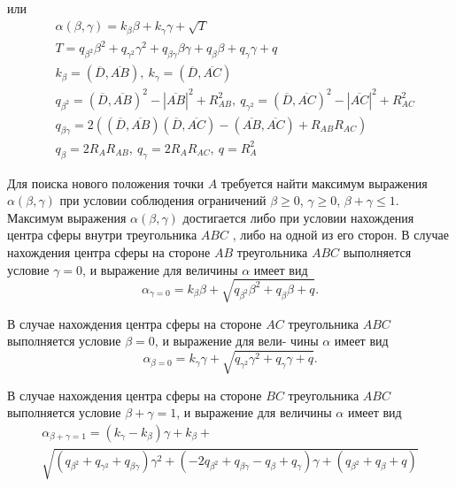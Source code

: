 или
\begin{equation}
	\begin{aligned}
		& \alpha(\beta, \gamma) = k_{\beta} \beta + k_{\gamma} \gamma + \sqrt{T} \\
		& T = q_{\beta^2} \beta^2 + q_{\gamma^2} \gamma^2 + q_{\beta \gamma} \beta \gamma + q_{\beta} \beta + q_{\gamma} \gamma + q \\
		& k_{\beta} = (\overline{D}, \overline{AB}), \ k_{\gamma} = (\overline{D}, \overline{AC}) \\
		& q_{\beta^2} = (\overline{D}, \overline{AB})^2 - |\overline{AB}|^2 + R_{AB}^2, \ q_{\gamma^2} = (\overline{D}, \overline{AC})^2 - |\overline{AC}|^2 + R_{AC}^2 \\
		& q_{\beta \gamma} = 2 \left( (\overline{D}, \overline{AB}) (\overline{D}, \overline{AC}) - (\overline{AB}, \overline{AC}) + R_{AB}R_{AC} \right) \\
		& q_{\beta} = 2 R_A R_{AB}, \ q_{\gamma} = 2 R_A R_{AC}, \ q = R_A^2
	\end{aligned}
\end{equation}

Для поиска нового положения точки $A$ требуется найти максимум выражения $\alpha(\beta,\gamma)$ при условии соблюдения ограничений $\beta \ge 0$, $\gamma \ge 0$, $\beta + \gamma \le 1$.
Максимум выражения $\alpha(\beta, \gamma)$ достигается либо при условии нахождения центра сферы внутри треугольника $ABC$ , либо на одной из его сторон.
В случае нахождения центра сферы на стороне $AB$ треугольника $ABC$ выполняется условие $\gamma = 0$, и выражение для величины $\alpha$ имеет вид
\begin{equation}
	\alpha_{\gamma = 0} = k_{\beta} \beta + \sqrt{q_{\beta^2} \beta^2 + q_{\beta} \beta + q}.
\end{equation}

В случае нахождения центра сферы на стороне $AC$ треугольника $ABC$ выполняется условие $\beta = 0$, и выражение для вели-
чины $\alpha$ имеет вид
\begin{equation}
	\alpha_{\beta = 0} = k_{\gamma} \gamma + \sqrt{q_{\gamma^2} \gamma^2 + q_{\gamma} \gamma + q}.
\end{equation}

В случае нахождения центра сферы на стороне $BC$ треугольника $ABC$ выполняется условие $\beta + \gamma = 1$, и выражение для величины $\alpha$ имеет вид
\begin{multline}
	\alpha_{\beta + \gamma = 1} = (k_{\gamma} - k_{\beta}) \gamma + k_{\beta} + \\
	\sqrt{(q_{\beta^2} + q_{\gamma^2} + q_{\beta \gamma}) \gamma^2 + (-2 q_{\beta^2} + q_{\beta \gamma} - q_{\beta} + q_{\gamma}) \gamma + (q_{\beta^2} + q_{\beta} + q)}
\end{multline}

